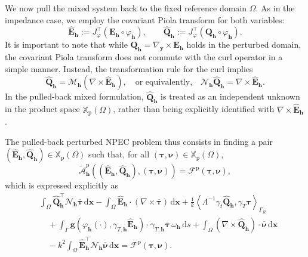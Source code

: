 \documentclass[10pt,a4paper]{amsart}
\numberwithin{equation}{section}
\begin{document}
We now pull the mixed system back to the fixed reference domain $\Omega$. As in the impedance case, we employ the covariant Piola transform for both variables:
\[
\hat{\mathbf{E}}_{\mathbf{h}} := J_\varphi^\top(\mathbf{E}_{\mathbf{h}} \circ \varphi_{\mathbf{h}}), \qquad \hat{\mathbf{Q}}_{\mathbf{h}} := J_\varphi^\top(\mathbf{Q}_{\mathbf{h}} \circ \varphi_{\mathbf{h}}).
\]
It is important to note that while $\mathbf{Q}_{\mathbf{h}} = \nabla_{\boldsymbol{y}} \times \mathbf{E}_{\mathbf{h}}$ holds in the perturbed domain, the covariant Piola transform does not commute with the curl operator in a simple manner. Instead, the transformation rule for the curl implies
\[
\hat{\mathbf{Q}}_{\mathbf{h}} = \mathcal{M}_{\mathbf{h}} (\nabla \times \hat{\mathbf{E}}_{\mathbf{h}}), \quad \text{or equivalently,} \quad \mathcal{N}_{\mathbf{h}} \hat{\mathbf{Q}}_{\mathbf{h}} = \nabla \times \hat{\mathbf{E}}_{\mathbf{h}}.
\]
In the pulled-back mixed formulation, $\hat{\mathbf{Q}}_{\mathbf{h}}$ is treated as an independent unknown in the product space $\mathbb{X}_{\mathrm{p}}(\Omega)$, rather than being explicitly identified with $\nabla \times \hat{\mathbf{E}}_{\mathbf{h}}$.

The pulled-back perturbed NPEC problem thus consists in finding a pair $(\hat{\mathbf{E}}_{\mathbf{h}}, \hat{\mathbf{Q}}_{\mathbf{h}}) \in \mathbb{X}_{\mathrm{p}}(\Omega)$ such that, for all $(\boldsymbol{\tau}, \boldsymbol{\nu}) \in \mathbb{X}_{\mathrm{p}}(\Omega)$,
\[
\widetilde{\mathcal{A}}^{\mathrm{p}}_{\mathbf{h}} \left( (\hat{\mathbf{E}}_{\mathbf{h}}, \hat{\mathbf{Q}}_{\mathbf{h}}), (\boldsymbol{\tau}, \boldsymbol{\nu}) \right) = \mathcal{F}^{\mathrm{p}}(\boldsymbol{\tau}, \boldsymbol{\nu}),
\]
which is expressed explicitly as
\[
\begin{aligned}
&\int_\Omega \hat{\mathbf{Q}}_{\mathbf{h}}^{\top} \mathcal{N}_{\mathbf{h}} \overline{\boldsymbol{\tau}} \,\mathrm{d}\boldsymbol{x} - \int_\Omega \hat{\mathbf{E}}_{\mathbf{h}} \cdot (\nabla \times \overline{\boldsymbol{\tau}}) \,\mathrm{d}\boldsymbol{x} + \frac{\mathrm{i}}{k} \left\langle \Lambda^{-1} \gamma_t \hat{\mathbf{Q}}_{\mathbf{h}}, \gamma_T \boldsymbol{\tau} \right\rangle_{\Gamma_R} \\
&\quad +\int_\Gamma \mathbf{g}(\varphi_{\mathbf{h}}(\cdot), \gamma_{T,\mathbf{h}} \hat{\mathbf{E}}_{\mathbf{h}}) \cdot \gamma_{T,\mathbf{h}} \overline{\boldsymbol{\tau}} \, \omega_{\mathbf{h}} \,\mathrm{d}s + \int_\Omega (\nabla \times \hat{\mathbf{Q}}_{\mathbf{h}}) \cdot \overline{\boldsymbol{\nu}} \,\mathrm{d}\boldsymbol{x} \\
&\quad - k^2 \int_\Omega \hat{\mathbf{E}}_{\mathbf{h}}^{\top} \mathcal{N}_{\mathbf{h}} \overline{\boldsymbol{\nu}} \,\mathrm{d}\boldsymbol{x} = \mathcal{F}^{\mathrm{p}}(\boldsymbol{\tau}, \boldsymbol{\nu}).
\end{aligned}
\]
\end{document}
